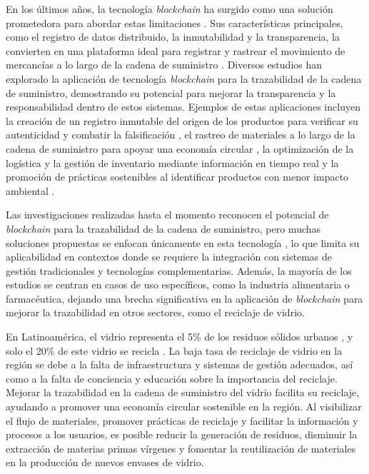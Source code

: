 En los últimos años, la tecnología \textit{blockchain} ha surgido como una solución prometedora para abordar estas limitaciones \cite{baralla2023waste, alnuaimi2023blockchain}. Sus características principales, como el registro de datos distribuido, la inmutabilidad y la transparencia, la convierten en una plataforma ideal para registrar y rastrear el movimiento de mercancías a lo largo de la cadena de suministro \cite{baralla2023waste}. Diversos estudios han explorado la aplicación de tecnología \textit{blockchain} para la trazabilidad de la cadena de suministro, demostrando su potencial para mejorar la transparencia y la responsabilidad dentro de estos sistemas. Ejemplos de estas aplicaciones incluyen la creación de un registro inmutable del origen de los productos para verificar su autenticidad y combatir la falsificación \cite{bulkowska2023implementation}, el rastreo de materiales a lo largo de la cadena de suministro para apoyar una economía circular \cite{baralla2023waste}, la optimización de la logística y la gestión de inventario mediante información en tiempo real \cite{signeblock2024} y la promoción de prácticas sostenibles al identificar productos con menor impacto ambiental \cite{bulkowska2023implementation}.

Las investigaciones realizadas hasta el momento reconocen el potencial de \textit{blockchain} para la trazabilidad de la cadena de suministro, pero muchas soluciones propuestas se enfocan únicamente en esta tecnología \cite{baralla2023waste, bulkowska2023implementation}, lo que limita su aplicabilidad en contextos donde se requiere la integración con sistemas de gestión tradicionales y tecnologías complementarias. Además, la mayoría de los estudios se centran en casos de uso específicos, como la industria alimentaria o farmacéutica, dejando una brecha significativa en la aplicación de \textit{blockchain} para mejorar la trazabilidad en otros sectores, como el reciclaje de vidrio.

En Latinoamérica, el vidrio representa el 5\% de los residuos sólidos urbanos \cite{cepal2021economia}, y solo el 20\% de este vidrio se recicla \cite{verallia2022whitebook}. La baja tasa de reciclaje de vidrio en la región se debe a la falta de infraestructura y sistemas de gestión adecuados, así como a la falta de conciencia y educación sobre la importancia del reciclaje. Mejorar la trazabilidad en la cadena de suministro del vidrio facilita su reciclaje, ayudando a promover una economía circular sostenible en la región. Al visibilizar el flujo de materiales, promover prácticas de reciclaje y facilitar la información y procesos a los usuarios, es posible reducir la generación de residuos, disminuir la extracción de materias primas vírgenes y fomentar la reutilización de materiales en la producción de nuevos envases de vidrio.

